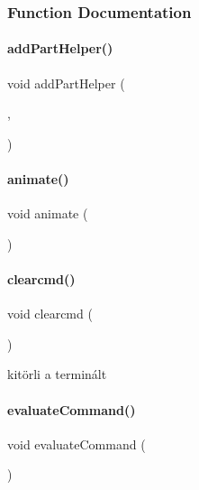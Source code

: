 \subsubsection{Function Documentation}
\mbox{\label{main_8h_af60ea04d4030a9371dd4d0dd61a0531f}} 
\paragraph{\texorpdfstring{addPartHelper()}{addPartHelper()}}
{\footnotesize\ttfamily void add\+Part\+Helper (\begin{DoxyParamCaption}\item[{\mbox{\hyperlink{class_inventory}{Inventory}} \&}]{,  }\item[{\mbox{\hyperlink{struct_temp_input}{Temp\+Input}} \&}]{ }\end{DoxyParamCaption})}

\mbox{\label{main_8h_ac83102103dbe7ba03fa00ab462055a6f}} 
\paragraph{\texorpdfstring{animate()}{animate()}}
{\footnotesize\ttfamily void animate (\begin{DoxyParamCaption}\item[{char}]{ }\end{DoxyParamCaption})}

\mbox{\label{main_8h_aaa6e5fc0d7c515998e48fe6ae944ca40}} 
\paragraph{\texorpdfstring{clearcmd()}{clearcmd()}}
{\footnotesize\ttfamily void clearcmd (\begin{DoxyParamCaption}{ }\end{DoxyParamCaption})\hspace{0.3cm}{\ttfamily [inline]}}



kitörli a terminált 

\mbox{\label{main_8h_aed630b39565f9b935d3148b396fd862d}} 
\paragraph{\texorpdfstring{evaluateCommand()}{evaluateCommand()}}
{\footnotesize\ttfamily void evaluate\+Command (\begin{DoxyParamCaption}\item[{enum \mbox{\hyperlink{main_8h_adbc27074b7dcd54cd4578936c6329d02}{enum\+Menu}} \&}]{ }\end{DoxyParamCaption})}

